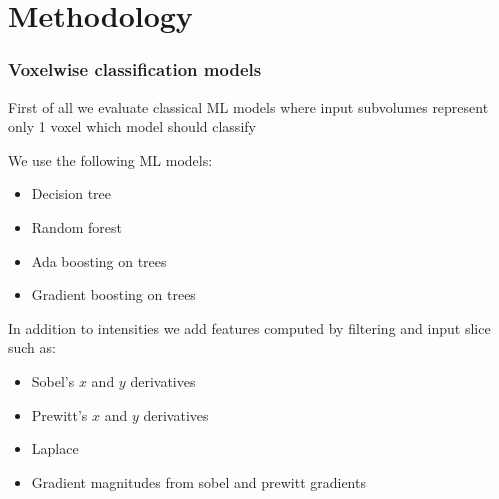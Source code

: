 \documentclass{beamer}
\begin{document}
\section{Methodology}

\begin{frame}
    \frametitle{Voxelwise classification models}

    First of all we evaluate classical ML models where input subvolumes represent only 1 voxel which model should classify
    \linebreak

    \begin{minipage}[t]{0.49\textwidth}
        We use the following ML models:
        \begin{itemize}
            \item Decision tree
            \item Random forest
            \item Ada boosting on trees
            \item Gradient boosting on trees
        \end{itemize}
    \end{minipage}
    \begin{minipage}[t]{0.49\textwidth}
        In addition to intensities we add features computed by filtering and input slice such as:
        \begin{itemize}
            \item Sobel's \(x \) and \(y\) derivatives
            \item Prewitt's \(x \) and \(y\) derivatives
            \item Laplace
            \item Gradient magnitudes from sobel and prewitt gradients
        \end{itemize}
    \end{minipage}
\end{frame}
\end{document}

